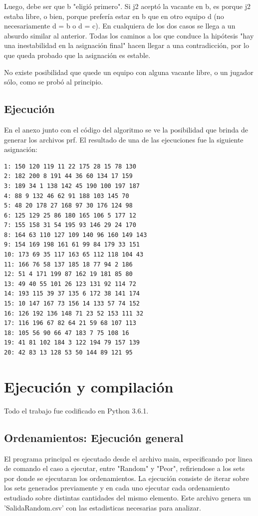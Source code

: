 \documentclass[article,a4paper]{article}
\begin{document}
Luego, debe ser que b "eligió primero". Si j2 aceptó la vacante en b, es porque j2 estaba libre, o bien, porque prefería estar en b que en otro equipo d (no necesariamente d = b o d = c). En cualquiera de los dos casos se llega a un absurdo similar al anterior.
Todas los caminos a los que conduce la hipótesis "hay una inestabilidad en la asignación final" hacen llegar a una contradicción, por lo que queda probado que la asignación es estable.

No existe posibilidad que quede un equipo con alguna vacante libre, o un jugador sólo, como se probó al principio.

\subsection{Ejecución}
En el anexo junto con el código del algoritmo se ve la posibilidad que brinda de generar los archivos prf. El resultado de una de las ejecuciones fue la siguiente asignación: 

\begin{verbatim}
1: 150 120 119 11 22 175 28 15 78 130
2: 182 200 8 191 44 36 60 134 17 159
3: 189 34 1 138 142 45 190 100 197 187
4: 88 9 132 46 62 91 188 103 145 70
5: 48 20 178 27 168 97 30 176 124 98
6: 125 129 25 86 180 165 106 5 177 12
7: 155 158 31 54 195 93 146 29 24 170
8: 164 63 110 127 109 140 96 160 149 143
9: 154 169 198 161 61 99 84 179 33 151
10: 173 69 35 117 163 65 112 118 104 43
11: 166 76 58 137 185 18 77 94 2 186
12: 51 4 171 199 87 162 19 181 85 80
13: 49 40 55 101 26 123 131 92 114 72
14: 193 115 39 37 135 6 172 38 141 174
15: 10 147 167 73 156 14 133 57 74 152
16: 126 192 136 148 71 23 52 153 111 32
17: 116 196 67 82 64 21 59 68 107 113
18: 105 56 90 66 47 183 7 75 108 16
19: 41 81 102 184 3 122 194 79 157 139
20: 42 83 13 128 53 50 144 89 121 95
\end{verbatim}


\appendix

\section{Ejecución y compilación}

Todo el trabajo fue codificado en Python 3.6.1. 

\subsection{Ordenamientos: Ejecución general}

El programa principal es ejecutado desde el archivo main, especificando por linea de comando el caso a ejecutar, entre "Random" y "Peor", refiriendose a los sets por donde se ejecutaran los ordenamientos. La ejecución consiste de iterar sobre los sets generados previamente y en cada uno ejecutar cada ordenamiento estudiado sobre distintas cantidades del mismo elemento. Este archivo genera un 'SalidaRandom.csv' con las estadisticas necesarias para analizar.
\end{document}
